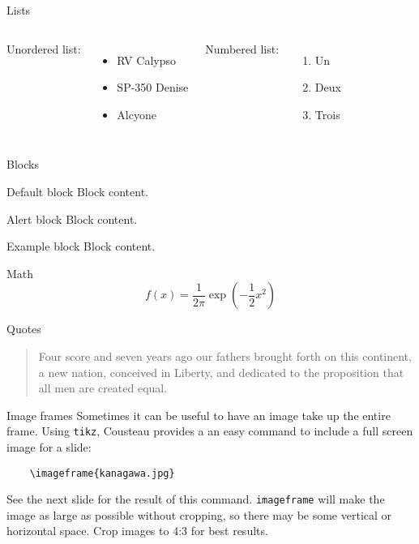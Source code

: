 \documentclass{beamer}
\begin{document}
\begin{frame}{Lists}
  \begin{columns}
    Unordered list:
    \begin{itemize}
    \item RV Calypso
    \item SP-350 Denise
    \item Alcyone
    \end{itemize}

    Numbered list: 
    \begin{enumerate}
    \item Un
    \item Deux
    \item Trois
    \end{enumerate}
  \end{columns} 
  
\end{frame}

\begin{frame}{Blocks}

  \begin{block}{Default block}
    Block content.
  \end{block}

  \begin{alertblock}{Alert block}
    Block content.
  \end{alertblock}

  \begin{exampleblock}{Example block}  
    Block content.
  \end{exampleblock}

\end{frame}

\begin{frame}{Math}
  \[f(x) = \frac{1}{2\pi}\exp\left( -\frac{1}{2}x^2 \right)\]
\end{frame}

\begin{frame}{Quotes}
  \begin{quote}
    Four score and seven years ago our fathers brought forth on this continent, a new nation, conceived in Liberty, and dedicated to the proposition that all men are created equal.
  \end{quote}
\end{frame}

\begin{frame}[fragile]{Image frames}
  Sometimes it can be useful to have an image take up the entire frame. Using \texttt{tikz}, Cousteau provides a an easy command to include a full screen image for a slide:
\begin{verbatim}
    \imageframe{kanagawa.jpg}
\end{verbatim}
See the next slide for the result of this command. \texttt{imageframe} will make the image as large as possible without cropping, so there may be some vertical or horizontal space. Crop images to 4:3 for best results. 
\end{frame}
\end{document}
